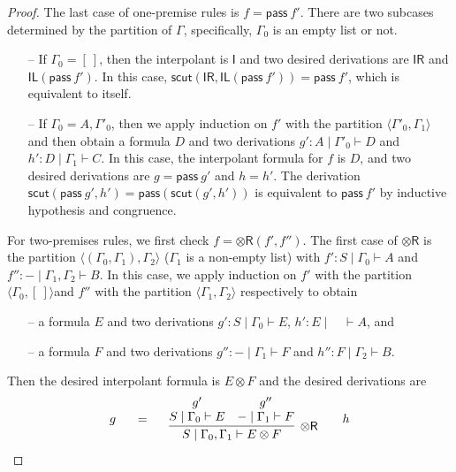 \documentclass[sn-mathphys-num]{sn-jnl}%
\newcommand{\GG}{\Gamma}
\newcommand{\vd}{\vdash}
\newcommand{\tr}{\otimes\mathsf{R}}
\newcommand{\pass}{\mathsf{pass}}
\newcommand{\unitl}{\mathsf{IL}}
\newcommand{\unitr}{\mathsf{IR}}
\newcommand{\ot}{\otimes}
\newcommand{\unit}{\mathsf{I}}
\newcommand{\mf}[1]{\mathsf{#1}}
\newcommand{\scut}[2]{\mf{scut} (#1 , #2)}
\theoremstyle{thmstyleone}%
\theoremstyle{thmstyletwo}%
\theoremstyle{thmstylethree}%
\begin{document}
\begin{proof}
The last case of one-premise rules is $ f = \pass \ f'$.
There are two subcases determined by the partition of $\GG$, specifically, $\GG_0$ is an empty list or not.
\begin{itemize}
  \item[--] If $\GG_0 = [\ ]$, then the interpolant is $\unit$ and two desired derivations are $\unitr$ and $\unitl (\pass \ f')$. In this case, $\scut{\unitr}{\unitl (\pass \ f')} = \pass \ f'$, which is equivalent to itself.
  \item[--] If $\GG_0 = A, \GG'_0$, then we apply induction on $f'$ with the partition $\langle \GG'_0, \GG_1 \rangle$ and then obtain a formula $D$ and two derivations $g' : A \mid \GG'_0 \vd D$ and $h' : D \mid \GG_1 \vd C$.
In this case, the interpolant formula for $f$ is $D$, and two desired derivations are $g = \pass \ g'$ and $h = h'$.
The derivation $\scut{\pass \ g'}{h'} = \pass (\scut{g'}{h'})$ is equivalent to $\pass \ f'$ by inductive hypothesis and congruence.
\end{itemize} 
For two-premises rules, we first check $f = \tr (f',f'')$.
The first case of $\tr$ is the partition $\langle (\GG_0, \GG_1), \GG_2 \rangle$ ($\GG_1$ is a non-empty list) with $f' : S \mid \GG_0 \vd A$ and $f'': {-} \mid \GG_1, \GG_2 \vd B$.
In this case, we apply induction on $f'$ with the partition $\langle \GG_0 , [\ ] \rangle $and $f''$ with the partition $\langle \GG_1 , \GG_2 \rangle$ respectively to obtain
\begin{itemize}
  \item[--] a formula $E$ and two derivations $g' : S \mid \GG_0 \vd E$, $h' : E \mid \quad \vd A$, and
  \item[--] a formula $F$ and two derivations $g'' : {-} \mid \GG_1 \vd F$ and $h'' : F \mid \GG_2 \vd B$.
\end{itemize}
Then the desired interpolant formula is $E \ot F$ and the desired derivations are
\begin{displaymath}
  \begin{array}{c}
  \begin{array}{c}
    g
  \end{array}
  \quad
  =
  \quad
  \begin{array}{c}
    \infer[\tr]{S \mid \GG_0 , \GG_1 \vd E \ot F}{
      \deduce{S \mid \GG_0 \vd E}{g'}
      &
      \deduce{{-} \mid \GG_1 \vd F}{g''}
    }
  \end{array}
    \quad
    \begin{array}{c}
      h
    \end{array}

\end{array}
\end{displaymath}
\end{proof}
\end{document}
